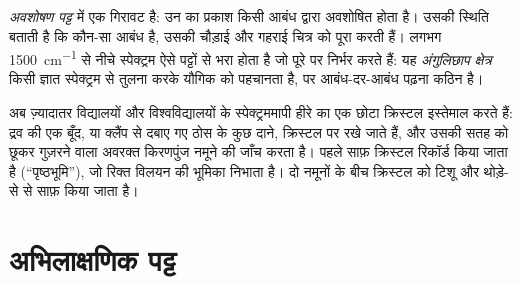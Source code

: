 \begin{definition}[अवशोषण पट्ट, अंगुलिछाप क्षेत्र]\label{def:g11:infrared:band}
\emph{अवशोषण पट्ट}  में एक गिरावट है: उन  का प्रकाश किसी आबंध द्वारा अवशोषित होता है। उसकी
स्थिति बताती है कि कौन-सा आबंध है, उसकी चौड़ाई और गहराई चित्र को पूरा करती हैं।
लगभग \qty{1500}{cm^{-1}} से नीचे स्पेक्ट्रम ऐसे पट्टों से भरा होता है
जो पूरे  पर निर्भर करते हैं: यह \emph{अंगुलिछाप
क्षेत्र} किसी ज्ञात स्पेक्ट्रम से तुलना करके यौगिक को
पहचानता है, पर आबंध-दर-आबंध पढ़ना कठिन है।
\end{definition}

\begin{inthelab}[स्पेक्ट्रम रिकॉर्ड करना]
अब ज़्यादातर विद्यालयों और विश्वविद्यालयों के स्पेक्ट्रममापी हीरे का एक छोटा क्रिस्टल
इस्तेमाल करते हैं: द्रव की एक बूँद, या क्लैंप से दबाए गए ठोस के कुछ दाने, क्रिस्टल
पर रखे जाते हैं, और उसकी सतह को छूकर गुज़रने वाला अवरक्त किरणपुंज नमूने की
जाँच करता है। पहले साफ़ क्रिस्टल रिकॉर्ड किया जाता है (``पृष्ठभूमि''), जो
रिक्त विलयन की भूमिका निभाता है। दो नमूनों के बीच क्रिस्टल को टिशू और थोड़े-से
 से साफ़ किया जाता है।
\end{inthelab}

\section{अभिलाक्षणिक पट्ट}

